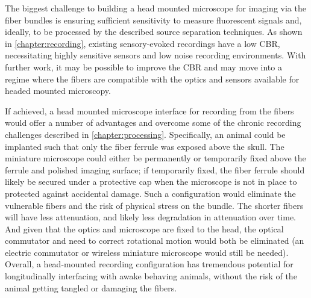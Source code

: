 The biggest challenge to building a head 
mounted microscope for imaging via the fiber 
bundles is ensuring sufficient sensitivity 
to measure fluorescent signals and, ideally,
to be processed by the described source 
separation techniques. As shown in 
\cref{chapter:recording}, existing 
sensory-evoked recordings have a low 
CBR, necessitating highly sensitive sensors 
and low noise recording environments. With 
further work, it may be possible to improve 
the CBR and may move into a regime where the 
fibers are compatible with the optics and 
sensors available for headed mounted microscopy.

If achieved, a head mounted microscope interface 
for recording from the fibers would offer a number 
of advantages and overcome some of the chronic 
recording challenges described in 
\cref{chapter:processing}. Specifically, an animal 
could be implanted such that only the fiber ferrule 
was exposed above the skull. The miniature 
microscope could either be permanently or temporarily 
fixed above the ferrule and polished imaging surface; 
if temporarily fixed, the fiber ferrule should likely 
be secured under a protective cap when the microscope 
is not in place to protected against accidental 
damage. Such a configuration would eliminate the 
vulnerable fibers and the risk of physical stress on 
the bundle. The shorter fibers will have less 
attenuation, and likely less degradation in attenuation 
over time. And given that the optics and microscope 
are fixed to the head, the optical commutator and 
need to correct rotational motion would both be 
eliminated (an electric commutator or wireless miniature 
microscope would still be needed). Overall, a head-mounted 
recording configuration has tremendous potential for 
longitudinally interfacing with awake behaving animals, 
without the risk of the animal getting tangled or 
damaging the fibers.

